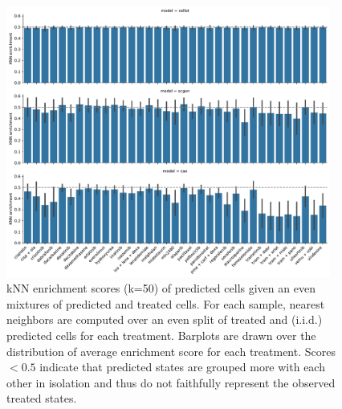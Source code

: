 \begin{figure}[h]
  \begin{center}
    \includegraphics[width=0.95\textwidth]{figures/cellot-cohort/supplement/knn-enrichment-iid.pdf}
  \end{center}
  \caption{
  kNN enrichment scores (k=50) of predicted cells given an even mixtures of predicted and treated cells. For each sample, nearest neighbors are computed over an even split of treated and (i.i.d.) predicted cells for each treatment. Barplots are drawn over the distribution of average enrichment score for each treatment. Scores $< 0.5$ indicate that predicted states are grouped more with each other in isolation and thus do not faithfully represent the observed treated states.
  }
\label{fig:cellot-cohort-iid-knn}
\end{figure}

